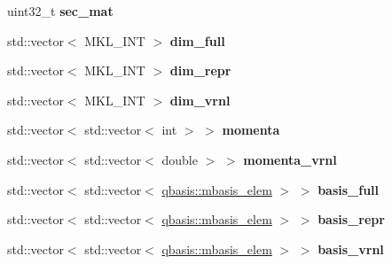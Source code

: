 \begin{DoxyCompactItemize}
\mbox{\label{classqbasis_1_1model_a3ae1ebd06ac1614cf6243c433ae48a9d}} 
uint32\+\_\+t {\bfseries sec\+\_\+mat}
\item 
\mbox{\label{classqbasis_1_1model_a7cb1ec5fce184e6667b868232a9a1658}} 
std\+::vector$<$ M\+K\+L\+\_\+\+I\+NT $>$ {\bfseries dim\+\_\+full}
\item 
\mbox{\label{classqbasis_1_1model_acbbf37ad141aa05942b769c90d74baab}} 
std\+::vector$<$ M\+K\+L\+\_\+\+I\+NT $>$ {\bfseries dim\+\_\+repr}
\item 
\mbox{\label{classqbasis_1_1model_a3196dc565959c56f4d68d0a0312700ba}} 
std\+::vector$<$ M\+K\+L\+\_\+\+I\+NT $>$ {\bfseries dim\+\_\+vrnl}
\item 
\mbox{\label{classqbasis_1_1model_ac99fa411f9b65e007d04b7243ecc1dd1}} 
std\+::vector$<$ std\+::vector$<$ int $>$ $>$ {\bfseries momenta}
\item 
\mbox{\label{classqbasis_1_1model_a3e2d9a872f86c3290e1387526d3f6713}} 
std\+::vector$<$ std\+::vector$<$ double $>$ $>$ {\bfseries momenta\+\_\+vrnl}
\item 
\mbox{\label{classqbasis_1_1model_a16feabf2dd74017307a4bd11dafce1ad}} 
std\+::vector$<$ std\+::vector$<$ \hyperlink{classqbasis_1_1mbasis__elem}{qbasis\+::mbasis\+\_\+elem} $>$ $>$ {\bfseries basis\+\_\+full}
\item 
\mbox{\label{classqbasis_1_1model_afc67218b5091a328c4b3419c636f633b}} 
std\+::vector$<$ std\+::vector$<$ \hyperlink{classqbasis_1_1mbasis__elem}{qbasis\+::mbasis\+\_\+elem} $>$ $>$ {\bfseries basis\+\_\+repr}
\item 
\mbox{\label{classqbasis_1_1model_a515f88b607a69ff8c8bbe8fccd887cc2}} 
std\+::vector$<$ std\+::vector$<$ \hyperlink{classqbasis_1_1mbasis__elem}{qbasis\+::mbasis\+\_\+elem} $>$ $>$ {\bfseries basis\+\_\+vrnl}
\item 
\mbox{\label{classqbasis_1_1model_a533cc1ce1dcf8142c7e2ecb4944c2b94}} 

\end{DoxyCompactItemize}
